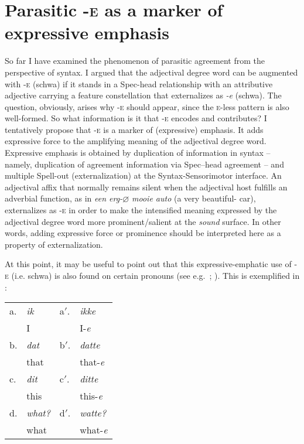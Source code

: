 \documentclass[output=paper]{langsci/langscibook}
\begin{document}
\section{Parasitic \textsc{-e} as a marker of expressive
emphasis}\label{sec:key:18.8}

So far I have examined the phenomenon of parasitic agreement from the
perspective of syntax. I argued that the adjectival degree word can be
augmented with \textsc{-e} (schwa) if it stands in a Spec-head relationship
with an attributive adjective carrying a feature constellation that
externalizes as \emph{-e} (schwa). The question, obviously, arises why
\textsc{-e} should appear, since the \textsc{e-}less pattern is also
well-formed. So what information is it that \textsc{-e} encodes and
contributes? I tentatively propose that \textsc{-e} is a marker of (expressive)
emphasis. It adds expressive force to the amplifying meaning of the adjectival
degree word. Expressive emphasis is obtained by duplication of information in
syntax – namely, duplication of agreement information via Spec--head agreement –
and multiple Spell-out (externalization) at the Syntax-Sensorimotor interface.
An adjectival affix that normally remains silent when the adjectival host
fulfills an adverbial function, as in \emph{een erg-${\varnothing}$ mooie auto}
(a very beautiful-\Agr{} car), externalizes as \textsc{-e} in order to make the
intensified meaning expressed by the adjectival degree word more
prominent/salient at the \emph{sound} surface. In other words, adding
expressive force or prominence should be interpreted here as a property of
externalization.

At this point, it may be useful to point out that this expressive-emphatic use
of \textsc{-e} (i.e. schwa) is also found on certain  pronouns (see
e.g.\ \citealt[237--238]{HaeserynEtAl1997}; \citealt{Hoeksema2000,Zwart2001}).
This is exemplified in :

\begin{exe}
    \ex\label{ex:key:18.55}
    \begin{tabularx}{.40\textwidth}[t]{llll}
        a. & \emph{ik} & a$'$. & \emph{ikke}\\
           & I & & I-\emph{e}\\
        b. & \emph{dat} & b$'$. & \emph{datte}\\
           & that & & that-\emph{e}\\
        c. & \emph{dit} & c$'$. & \emph{ditte}\\
           & this & & this-\emph{e}\\
        d. & \emph{what?} & d$'$. & \emph{watte?}\\
           & what & & what-\emph{e}\\
    \end{tabularx}
\end{exe}
\end{document}
